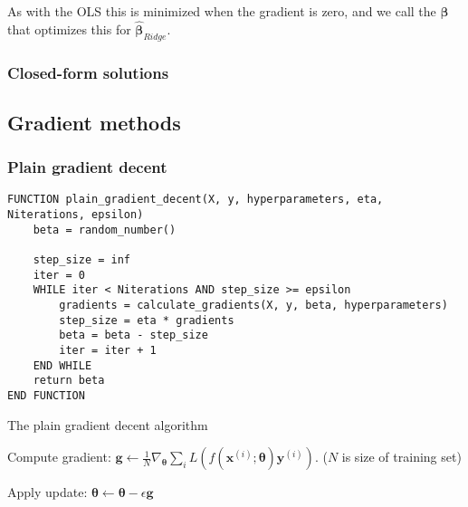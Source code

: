 As with the OLS this is minimized when the gradient is zero, and we call the $\boldsymbol\beta$ that optimizes this for $\hat{\boldsymbol\beta}_{Ridge}$. 

\subsubsection{Closed-form solutions}
\begin{comment}
Both the OLS- and Ridge-methods have closed-form analytical solutions. 
These can easily be found by deriving the cost function with respect to $\boldsymbol{\beta}$. 
\end{comment}

\subsection{Gradient methods}

\subsubsection{Plain gradient decent}
\begin{lstlisting}
FUNCTION plain_gradient_decent(X, y, hyperparameters, eta, Niterations, epsilon)
	beta = random_number()

	step_size = inf
	iter = 0
	WHILE iter < Niterations AND step_size >= epsilon
		gradients = calculate_gradients(X, y, beta, hyperparameters)
		step_size = eta * gradients
		beta = beta - step_size
		iter = iter + 1
	END WHILE
	return beta
END FUNCTION
\end{lstlisting}

\begin{algorithm}
\caption{The plain gradient decent algorithm}\label{alg:plain_gd}
\begin{algorithmic}
    
        
        Compute gradient: $\boldsymbol{g}\gets \frac{1}{N}\nabla_{\boldsymbol\theta}
        \sum_{i}L(f(\boldsymbol{x}^{(i)};\boldsymbol{\theta})\boldsymbol{y}^{(i)})$.
        ($N$ is size of training set)

        Apply update: $\boldsymbol\theta \gets \boldsymbol\theta
        -\epsilon\boldsymbol{g}$
    \EndWhile
\end{algorithmic}
\end{algorithm}


